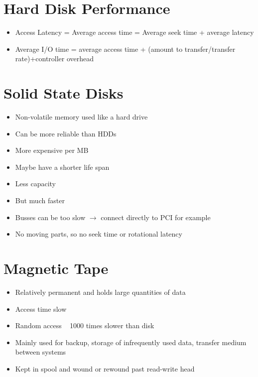\documentclass{article}[18pt]
\begin{document}
\section{Hard Disk Performance}
\begin{itemize}
	\item Access Latency = Average access time = Average seek time + average latency
	\item Average I/O time = average access time + (amount to transfer/transfer rate)+controller overhead
\end{itemize}
\section{Solid State Disks}
\begin{itemize}
	\item Non-volatile memory used like a hard drive
	\item Can be more reliable than HDDs
	\item More expensive per MB
	\item Maybe have a shorter life span
	\item Less capacity
	\item But much faster
	\item Busses can be too slow $\rightarrow$ connect directly to PCI for example
	\item No moving parts, so no seek time or rotational latency 
\end{itemize}
\section{Magnetic Tape}
\begin{itemize}
	\item Relatively permanent and holds large quantities of data
	\item Access time slow
	\item Random access ~ 1000 times slower than disk
	\item Mainly used for backup, storage of infrequently used data, transfer medium between systems
	\item Kept in spool and wound or rewound past read-write head
\end{itemize}
\end{document}
